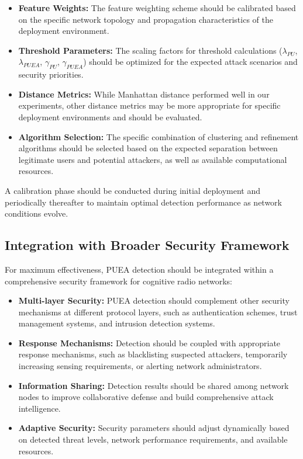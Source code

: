 \begin{itemize}
    \item \textbf{Feature Weights:} The feature weighting scheme should be calibrated based on the specific network topology and propagation characteristics of the deployment environment.
    
    \item \textbf{Threshold Parameters:} The scaling factors for threshold calculations ($\lambda_{PU}$, $\lambda_{PUEA}$, $\gamma_{PU}$, $\gamma_{PUEA}$) should be optimized for the expected attack scenarios and security priorities.
    
    \item \textbf{Distance Metrics:} While Manhattan distance performed well in our experiments, other distance metrics may be more appropriate for specific deployment environments and should be evaluated.
    
    \item \textbf{Algorithm Selection:} The specific combination of clustering and refinement algorithms should be selected based on the expected separation between legitimate users and potential attackers, as well as available computational resources.
\end{itemize}

A calibration phase should be conducted during initial deployment and periodically thereafter to maintain optimal detection performance as network conditions evolve.

\subsection{Integration with Broader Security Framework}

For maximum effectiveness, PUEA detection should be integrated within a comprehensive security framework for cognitive radio networks:

\begin{itemize}
    \item \textbf{Multi-layer Security:} PUEA detection should complement other security mechanisms at different protocol layers, such as authentication schemes, trust management systems, and intrusion detection systems.
    
    \item \textbf{Response Mechanisms:} Detection should be coupled with appropriate response mechanisms, such as blacklisting suspected attackers, temporarily increasing sensing requirements, or alerting network administrators.
    
    \item \textbf{Information Sharing:} Detection results should be shared among network nodes to improve collaborative defense and build comprehensive attack intelligence.
    
    \item \textbf{Adaptive Security:} Security parameters should adjust dynamically based on detected threat levels, network performance requirements, and available resources.
\end{itemize}

